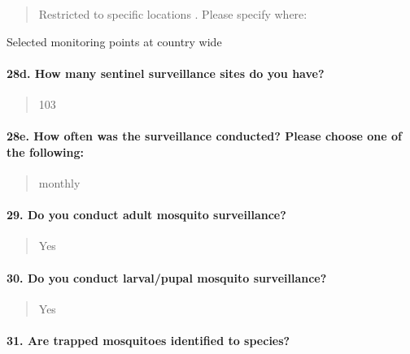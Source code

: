 \documentclass[
]{article}
\begin{document}
\begin{quote}
Restricted to specific locations . Please specify where:
\end{quote}

Selected monitoring points at country wide

\hypertarget{d.-how-many-sentinel-surveillance-sites-do-you-have}{%
\paragraph{28d. How many sentinel surveillance sites do you
have?}\label{d.-how-many-sentinel-surveillance-sites-do-you-have}}

\begin{quote}
103
\end{quote}

\hypertarget{e.-how-often-was-the-surveillance-conducted-please-choose-one-of-the-following}{%
\paragraph{28e. How often was the surveillance conducted? Please choose
one of the
following:}\label{e.-how-often-was-the-surveillance-conducted-please-choose-one-of-the-following}}

\begin{quote}
monthly
\end{quote}

\hypertarget{do-you-conduct-adult-mosquito-surveillance}{%
\paragraph{29. Do you conduct adult mosquito
surveillance?}\label{do-you-conduct-adult-mosquito-surveillance}}

\begin{quote}
Yes
\end{quote}

\hypertarget{do-you-conduct-larvalpupal-mosquito-surveillance}{%
\paragraph{30. Do you conduct larval/pupal mosquito
surveillance?}\label{do-you-conduct-larvalpupal-mosquito-surveillance}}

\begin{quote}
Yes
\end{quote}

\hypertarget{are-trapped-mosquitoes-identified-to-species}{%
\paragraph{31. Are trapped mosquitoes identified to
species?}\label{are-trapped-mosquitoes-identified-to-species}}
\end{document}
